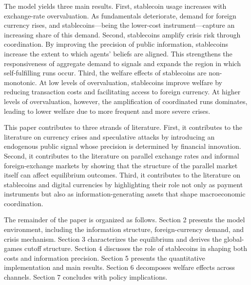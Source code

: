The model yields three main results. First, stablecoin usage increases with exchange-rate overvaluation. As fundamentals deteriorate, demand for foreign currency rises, and stablecoins---being the lower-cost instrument---capture an increasing share of this demand. Second, stablecoins amplify crisis risk through coordination. By improving the precision of public information, stablecoins increase the extent to which agents' beliefs are aligned. This strengthens the responsiveness of aggregate demand to signals and expands the region in which self-fulfilling runs occur. Third, the welfare effects of stablecoins are non-monotonic. At low levels of overvaluation, stablecoins improve welfare by reducing transaction costs and facilitating access to foreign currency. At higher levels of overvaluation, however, the amplification of coordinated runs dominates, leading to lower welfare due to more frequent and more severe crises.

This paper contributes to three strands of literature. First, it contributes to the literature on currency crises and speculative attacks by introducing an endogenous public signal whose precision is determined by financial innovation. Second, it contributes to the literature on parallel exchange rates and informal foreign-exchange markets by showing that the structure of the parallel market itself can affect equilibrium outcomes. Third, it contributes to the literature on stablecoins and digital currencies by highlighting their role not only as payment instruments but also as information-generating assets that shape macroeconomic coordination.

The remainder of the paper is organized as follows. Section 2 presents the model environment, including the information structure, foreign-currency demand, and crisis mechanism. Section 3 characterizes the equilibrium and derives the global-games cutoff structure. Section 4 discusses the role of stablecoins in shaping both costs and information precision. Section 5 presents the quantitative implementation and main results. Section 6 decomposes welfare effects across channels. Section 7 concludes with policy implications.
